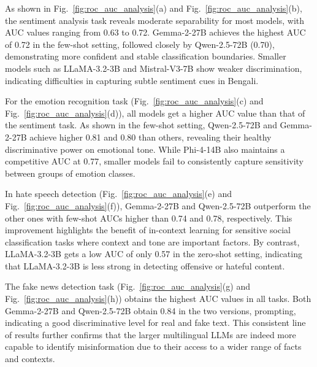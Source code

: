 \documentclass[10pt,letterpaper]{article}
\begin{document}
As shown in Fig.~\ref{fig:roc_auc_analysis}(a) and Fig.~\ref{fig:roc_auc_analysis}(b), the sentiment analysis task reveals moderate separability for most models, with AUC values ranging from 0.63 to 0.72. Gemma-2-27B achieves the highest AUC of 0.72 in the few-shot setting, followed closely by Qwen-2.5-72B (0.70), demonstrating more confident and stable classification boundaries. Smaller models such as LLaMA-3.2-3B and Mistral-V3-7B show weaker discrimination, indicating difficulties in capturing subtle sentiment cues in Bengali.

For the emotion recognition task (Fig.~\ref{fig:roc_auc_analysis}(c) and Fig.~\ref{fig:roc_auc_analysis}(d)), all models get a higher AUC value than that of the sentiment task. As shown in the few-shot setting, Qwen-2.5-72B and Gemma-2-27B achieve higher 0.81 and 0.80 than others, revealing their healthy discriminative power on emotional tone. While Phi-4-14B also maintains a competitive AUC at 0.77, smaller models fail to consistently capture sensitivity between groups of emotion classes.

In hate speech detection (Fig.~\ref{fig:roc_auc_analysis}(e) and Fig.~\ref{fig:roc_auc_analysis}(f)), Gemma-2-27B and Qwen-2.5-72B outperform the other ones with few-shot AUCs higher than 0.74 and 0.78, respectively. This improvement highlights the benefit of in-context learning for sensitive social classification tasks where context and tone are important factors. By contrast, LLaMA-3.2-3B gets a low AUC of only 0.57 in the zero-shot setting, indicating that LLaMA-3.2-3B is less strong in detecting offensive or hateful content.

The fake news detection task (Fig.~\ref{fig:roc_auc_analysis}(g) and Fig.~\ref{fig:roc_auc_analysis}(h)) obtains the highest AUC values in all tasks. Both Gemma-2-27B and Qwen-2.5-72B obtain 0.84 in the two versions, prompting, indicating a good discriminative level for real and fake text. This consistent line of results further confirms that the larger multilingual LLMs are indeed more capable to identify misinformation due to their access to a wider range of facts and contexts.
\end{document}
